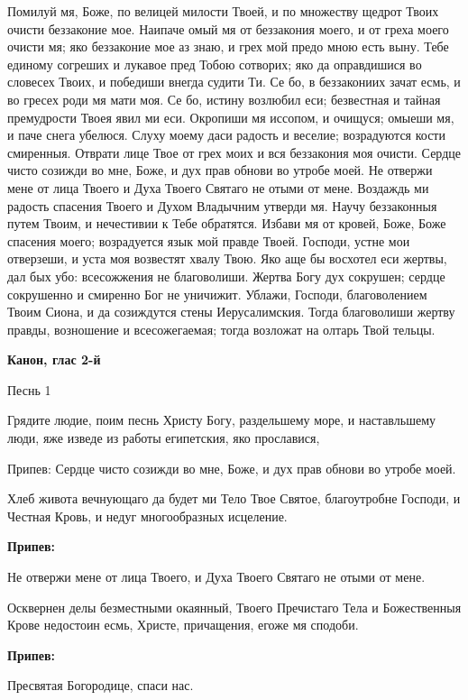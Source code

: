 Помилуй мя, Боже, по велицей милости Твоей, и по множеству щедрот Твоих очисти беззаконие мое. Наипаче омый мя от беззакония моего, и от греха моего очисти мя; яко беззаконие мое аз знаю, и грех мой предо мною есть выну. Тебе единому согреших и лукавое пред Тобою сотворих; яко да оправдишися во словесех Твоих, и победиши внегда судити Ти. Се бо, в беззакониих зачат есмь, и во гресех роди мя мати моя. Се бо, истину возлюбил еси; безвестная и тайная премудрости Твоея явил ми еси. Окропиши мя иссопом, и очищуся; омыеши мя, и паче снега убелюся. Слуху моему даси радость и веселие; возрадуются кости смиренныя. Отврати лице Твое от грех моих и вся беззакония моя очисти. Сердце чисто созижди во мне, Боже, и дух прав обнови во утробе моей. Не отвержи мене от лица Твоего и Духа Твоего Святаго не отыми от мене. Воздаждь ми радость спасения Твоего и Духом Владычним утверди мя. Научу беззаконныя путем Твоим, и нечестивии к Тебе обратятся. Избави мя от кровей, Боже, Боже спасения моего; возрадуется язык мой правде Твоей. Господи, устне мои отверзеши, и уста моя возвестят хвалу Твою. Яко аще бы восхотел еси жертвы, дал бых убо: всесожжения не благоволиши. Жертва Богу дух сокрушен; сердце сокрушенно и смиренно Бог не уничижит. Ублажи, Господи, благоволением Твоим Сиона, и да созиждутся стены Иерусалимския. Тогда благоволиши жертву правды, возношение и всесожегаемая; тогда возложат на олтарь Твой тельцы.




\medskip
\bfseries Канон, глас 2-й
\normalfont{}

\medskip
Песнь 1


Грядите людие, поим песнь Христу Богу, раздельшему море, и наставльшему люди, яже изведе из работы египетския, яко прославися,


Припев: Сердце чисто созижди во мне, Боже, и дух прав обнови во утробе моей.


Хлеб живота вечнующаго да будет ми Тело Твое Святое, благоутробне Господи, и Честная Кровь, и недуг многообразных исцеление.


\medskip
\bfseries Припев:\normalfont{} 


Не отвержи мене от лица Твоего, и Духа Твоего Святаго не отыми от мене.


Осквернен делы безместными окаянный, Твоего Пречистаго Тела и Божественныя Крове недостоин есмь, Христе, причащения, егоже мя сподоби.


\medskip
\bfseries Припев:\normalfont{} 


Пресвятая Богородице, спаси нас.


